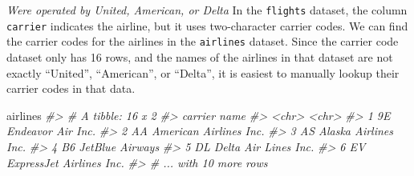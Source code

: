 \documentclass[]{book}
\newenvironment{Shaded}{\begin{snugshade}}{\end{snugshade}}
\newcommand{\CommentTok}[1]{\textcolor[rgb]{0.56,0.35,0.01}{\textit{#1}}}
\newcommand{\KeywordTok}[1]{\textcolor[rgb]{0.13,0.29,0.53}{\textbf{#1}}}
\newcommand{\NormalTok}[1]{#1}
\newcommand{\OperatorTok}[1]{\textcolor[rgb]{0.81,0.36,0.00}{\textbf{#1}}}
\newcommand{\StringTok}[1]{\textcolor[rgb]{0.31,0.60,0.02}{#1}}
\theoremstyle{plain}
\theoremstyle{remark}
\theoremstyle{definition}
\theoremstyle{definition}
\theoremstyle{definition}
\theoremstyle{remark}
\begin{document}
\begin{Shaded}
\end{Shaded}

\emph{Were operated by United, American, or Delta} In the
\texttt{flights} dataset, the column \texttt{carrier} indicates the
airline, but it uses two-character carrier codes. We can find the
carrier codes for the airlines in the \texttt{airlines} dataset. Since
the carrier code dataset only has 16 rows, and the names of the airlines
in that dataset are not exactly ``United'', ``American'', or ``Delta'',
it is easiest to manually lookup their carrier codes in that data.

\begin{Shaded}
\begin{Highlighting}[]
\NormalTok{airlines}
\CommentTok{#> # A tibble: 16 x 2}
\CommentTok{#>   carrier name                    }
\CommentTok{#>   <chr>   <chr>                   }
\CommentTok{#> 1 9E      Endeavor Air Inc.       }
\CommentTok{#> 2 AA      American Airlines Inc.  }
\CommentTok{#> 3 AS      Alaska Airlines Inc.    }
\CommentTok{#> 4 B6      JetBlue Airways         }
\CommentTok{#> 5 DL      Delta Air Lines Inc.    }
\CommentTok{#> 6 EV      ExpressJet Airlines Inc.}
\CommentTok{#> # ... with 10 more rows}
\end{Highlighting}
\end{Shaded}
\end{document}
